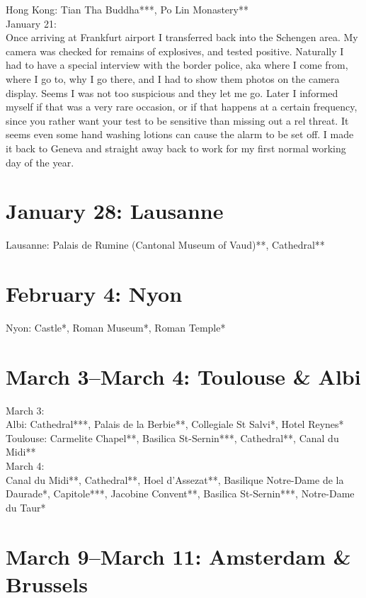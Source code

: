 Hong Kong: Tian Tha Buddha***, Po Lin Monastery**\\

January 21:\\
Once arriving at Frankfurt airport I transferred back into the Schengen area. My camera was checked for remains of explosives, and tested positive. Naturally I had to have a special interview with the border police, aka where I come from, where I go to, why I go there, and I had to show them photos on the camera display. Seems I was not too suspicious and they let me go. Later I informed myself if that was a very rare occasion, or if that happens at a certain frequency, since you rather want your test to be sensitive than missing out a rel threat. It seems even some hand washing lotions can cause the alarm to be set off. I made it back to Geneva and straight away back to work for my first normal working day of the year.\\

\section{January 28: Lausanne}
\label{Lausanne2018}

Lausanne: Palais de Rumine (Cantonal Museum of Vaud)**, Cathedral**

\section{February 4: Nyon}
\label{Nyon} 

Nyon: Castle*, Roman Museum*, Roman Temple*

\section{March 3--March 4: Toulouse \& Albi}
\label{Toulouse2018}

March 3:\\
Albi: Cathedral***, Palais de la Berbie**, Collegiale St Salvi*, Hotel Reynes*\\
Toulouse: Carmelite Chapel**, Basilica St-Sernin***, Cathedral**, Canal du Midi**\\

March 4:\\
Canal du Midi**, Cathedral**, Hoel d'Assezat**, Basilique Notre-Dame de la Daurade*, Capitole***, Jacobine Convent**, Basilica St-Sernin***, Notre-Dame du Taur*

\section{March 9--March 11: Amsterdam \& Brussels}
\label{BrusselsAmsterdam2018}

